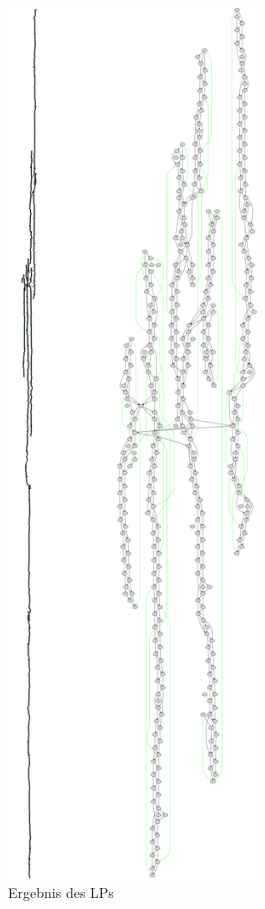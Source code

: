 \begin{figure}
\begin{center}
\includegraphics[width=6.6cm]{bilder/vergrossert}
\end{center}
\caption{Ergebnis des LPs}
\label{ersterdurchlauf}
\end{figure}
	
